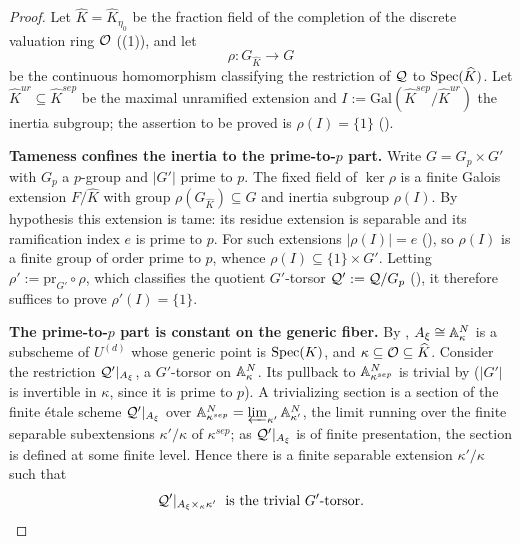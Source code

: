 \begin{proof}
    Let $\widehat{K} = \widehat{K}_{\eta_0}$ be the fraction field of the completion of the
    discrete valuation ring $\mathcal{O}$ ((1)), and let
    \[ \rho : G_{\widehat{K}} \longrightarrow G \]
    be the continuous homomorphism classifying the restriction of $\mathcal{Q}$ to
    $\operatorname{Spec}(\widehat{K})$. Let $\widehat{K}^{ur} \subseteq \widehat{K}^{sep}$ be the maximal
    unramified extension and $I := \mathrm{Gal}(\widehat{K}^{sep}/\widehat{K}^{ur})$ the
    inertia subgroup; the assertion to be proved is $\rho(I) = \{1\}$
    ().

    \textbf{Tameness confines the inertia to the prime-to-$p$ part.}
    Write $G = G_p \times G'$ with $G_p$ a $p$-group and $|G'|$ prime to $p$. The fixed
    field of $\ker \rho$ is a finite Galois extension $F/\widehat{K}$ with group
    $\rho(G_{\widehat{K}}) \subseteq G$ and inertia subgroup $\rho(I)$. By hypothesis this
    extension is tame: its residue extension is separable and its ramification index $e$
    is prime to $p$. For such extensions $|\rho(I)| = e$ (\cite[Ch.\ IV]{serreLF}), so
    $\rho(I)$ is a finite group of order prime to $p$, whence
    $\rho(I) \subseteq \{1\} \times G'$. Letting $\rho' := \mathrm{pr}_{G'} \circ \rho$,
    which classifies the quotient $G'$-torsor $\mathcal{Q}' := \mathcal{Q} / G_p$
    (), it therefore suffices to prove $\rho'(I) = \{1\}$.

    \textbf{The prime-to-$p$ part is constant on the generic fiber.}
    By , $A_\xi \cong \mathbb{A}^N_\kappa$ is a
    subscheme of $U^{(d)}$ whose generic point is $\operatorname{Spec}(K)$, and
    $\kappa \subseteq \mathcal{O} \subseteq \widehat{K}$. Consider the restriction
    $\mathcal{Q}'|_{A_\xi}$, a $G'$-torsor on $\mathbb{A}^N_\kappa$. Its pullback to
    $\mathbb{A}^N_{\kappa^{sep}}$ is trivial by  ($|G'|$ is
    invertible in $\kappa$, since it is prime to $p$). A trivializing section is a section
    of the finite étale scheme $\mathcal{Q}'|_{A_\xi}$ over $\mathbb{A}^N_{\kappa^{sep}} =
    \varprojlim_{\kappa'} \mathbb{A}^N_{\kappa'}$, the limit running over the finite separable
    subextensions $\kappa'/\kappa$ of $\kappa^{sep}$; as $\mathcal{Q}'|_{A_\xi}$ is of finite
    presentation, the section is defined at some finite level. Hence there is a finite
    separable extension $\kappa'/\kappa$ such that
    \[
    \mathcal{Q}'|_{A_\xi \times_\kappa \kappa'} \;\text{ is the trivial } G' \text{-torsor.}
    \]


\end{proof}
